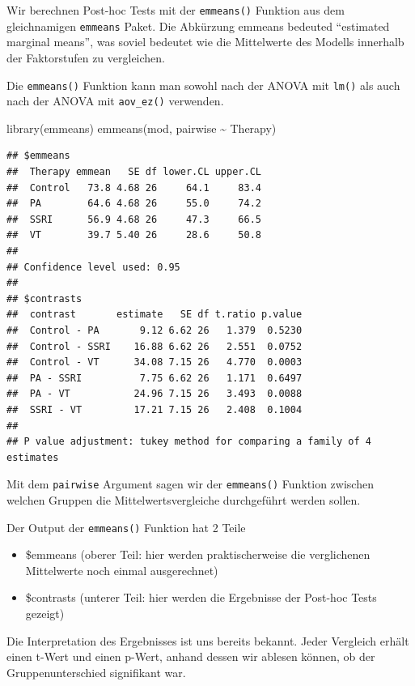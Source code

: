 \documentclass[
]{book}
\newenvironment{Shaded}{\begin{snugshade}}{\end{snugshade}}
\newcommand{\FunctionTok}[1]{\textcolor[rgb]{0.00,0.00,0.00}{#1}}
\newcommand{\NormalTok}[1]{#1}
\newcommand{\SpecialCharTok}[1]{\textcolor[rgb]{0.00,0.00,0.00}{#1}}
\providecommand{\tightlist}{%
  \setlength{\itemsep}{0pt}\setlength{\parskip}{0pt}}
\begin{document}
Wir berechnen Post-hoc Tests mit der \texttt{emmeans()} Funktion aus dem gleichnamigen \texttt{emmeans} Paket. Die Abkürzung emmeans bedeuted ``estimated marginal means'', was soviel bedeutet wie die Mittelwerte des Modells innerhalb der Faktorstufen zu vergleichen.

Die \texttt{emmeans()} Funktion kann man sowohl nach der ANOVA mit \texttt{lm()} als auch nach der ANOVA mit \texttt{aov\_ez()} verwenden.

\begin{Shaded}
\begin{Highlighting}[]
\FunctionTok{library}\NormalTok{(emmeans)}
\FunctionTok{emmeans}\NormalTok{(mod, pairwise }\SpecialCharTok{\textasciitilde{}}\NormalTok{ Therapy)}
\end{Highlighting}
\end{Shaded}

\begin{verbatim}
## $emmeans
##  Therapy emmean   SE df lower.CL upper.CL
##  Control   73.8 4.68 26     64.1     83.4
##  PA        64.6 4.68 26     55.0     74.2
##  SSRI      56.9 4.68 26     47.3     66.5
##  VT        39.7 5.40 26     28.6     50.8
## 
## Confidence level used: 0.95 
## 
## $contrasts
##  contrast       estimate   SE df t.ratio p.value
##  Control - PA       9.12 6.62 26   1.379  0.5230
##  Control - SSRI    16.88 6.62 26   2.551  0.0752
##  Control - VT      34.08 7.15 26   4.770  0.0003
##  PA - SSRI          7.75 6.62 26   1.171  0.6497
##  PA - VT           24.96 7.15 26   3.493  0.0088
##  SSRI - VT         17.21 7.15 26   2.408  0.1004
## 
## P value adjustment: tukey method for comparing a family of 4 estimates
\end{verbatim}

Mit dem \texttt{pairwise} Argument sagen wir der \texttt{emmeans()} Funktion zwischen welchen Gruppen die Mittelwertsvergleiche durchgeführt werden sollen.

Der Output der \texttt{emmeans()} Funktion hat 2 Teile

\begin{itemize}
\tightlist
\item
  \$emmeans (oberer Teil: hier werden praktischerweise die verglichenen Mittelwerte noch einmal ausgerechnet)
\item
  \$contrasts (unterer Teil: hier werden die Ergebnisse der Post-hoc Tests gezeigt)
\end{itemize}

Die Interpretation des Ergebnisses ist uns bereits bekannt. Jeder Vergleich erhält einen t-Wert und einen p-Wert, anhand dessen wir ablesen können, ob der Gruppenunterschied signifikant war.
\end{document}
